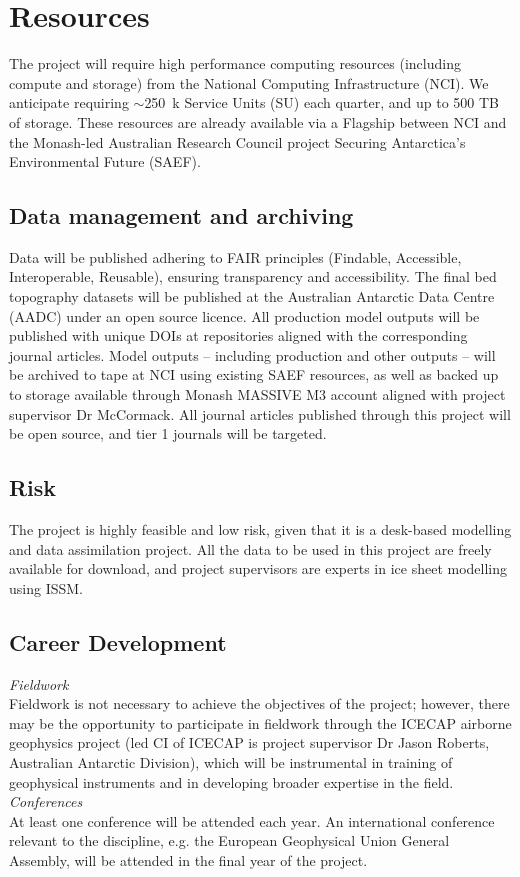 \chapter*{Resources}

The project will require high performance computing resources (including compute and storage) from the National Computing Infrastructure (NCI). We anticipate requiring $\sim$250~k Service Units (SU) each quarter, and up to 500 TB of storage. These resources are already available via a Flagship between NCI and the Monash-led Australian Research Council project Securing Antarctica’s Environmental Future (SAEF).

\section*{Data management and archiving}

Data will be published adhering to FAIR principles (Findable, Accessible, Interoperable, Reusable), ensuring transparency and accessibility. The final bed topography datasets will be published at the Australian Antarctic Data Centre (AADC) under an open source licence. All production model outputs will be published with unique DOIs at repositories aligned with the corresponding journal articles. Model outputs – including production and other outputs – will be archived to tape at NCI using existing SAEF resources, as well as backed up to storage available through Monash MASSIVE M3 account aligned with project supervisor Dr McCormack. All journal articles published through this project will be open source, and tier 1 journals will be targeted.

\section*{Risk}

The project is highly feasible and low risk, given that it is a desk-based modelling and data assimilation project. All the data to be used in this project are freely available for download, and project supervisors are experts in ice sheet modelling using ISSM.

\section*{Career Development}

\textit{Fieldwork}\\
Fieldwork is not necessary to achieve the objectives of the project; however, there may be the opportunity to participate in fieldwork through the ICECAP airborne geophysics project (led CI of ICECAP is project supervisor Dr Jason Roberts, Australian Antarctic Division), which will be instrumental in training of geophysical instruments and in developing broader expertise in the field. \\
\textit{Conferences}\\
At least one conference will be attended each year. An international conference relevant to the discipline, e.g. the European Geophysical Union General Assembly, will be attended in the final year of the project.